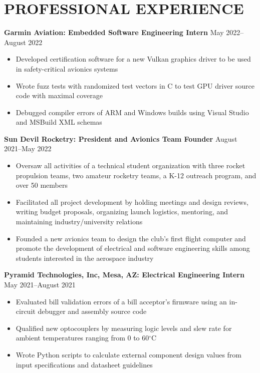 \documentclass{article}
\begin{document}
\section{PROFESSIONAL EXPERIENCE}
\textbf{Garmin Aviation: Embedded Software Engineering Intern}
\hfill
\vspace{0.5em}
May 2022--August 2022
\begin{itemize}
\item{Developed certification software for a new Vulkan graphics driver to be used in safety-critical avionics systems}
\item{Wrote fuzz tests with randomized test vectors in C to test GPU driver source code with maximal coverage}
\item{Debugged compiler errors of ARM and Windows builds using Visual Studio and MSBuild XML schemas}
\end{itemize}
\vspace{1em}
\textbf{Sun Devil Rocketry: President and Avionics Team Founder}
\hfill
\vspace{0.5em}
August 2021--May 2022
\begin{itemize}
\item{Oversaw all activities of a technical student organization with three rocket propulsion teams, two amateur rocketry teams, a K-12 outreach program, and over 50 members   }
\item{Facilitated all project development by holding meetings and design reviews, writing budget proposals, organizing launch logistics, mentoring, and maintaining industry/university relations}
\item{Founded a new avionics team to design the club's first flight computer and promote the development of electrical and software engineering skills among students interested in the aerospace industry}
\vspace{1em}
\end{itemize}
\textbf{Pyramid Technologies, Inc, Mesa, AZ: Electrical Engineering Intern}
\hfill 
\vspace{0.5em}
May 2021--August 2021
\begin{itemize}
\item{Evaluated bill validation errors of a bill acceptor's firmware using an in-circuit debugger and assembly source code}
\item{Qualified new optocouplers by measuring logic levels and slew rate for ambient temperatures ranging from 0 to 60$^{\circ}$C}
\item{Wrote Python scripts to calculate external component design values from input specifications and datasheet guidelines}
\end{itemize}
\end{document}
